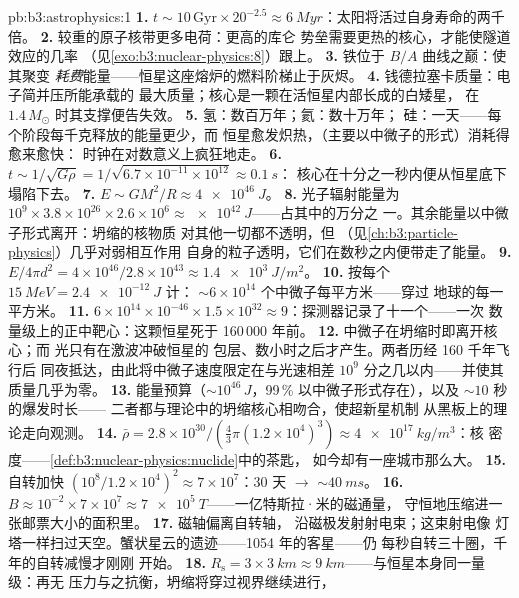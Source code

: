 \begin{solution}{pb:b3:astrophysics:1}
\textbf{1.} $t \sim 10\,\text{Gyr}\times20^{-2.5} \approx
\qty{6}{Myr}$：太阳将活过自身寿命的两千倍。
\textbf{2.} 较重的原子核带更多电荷：更高的库仑
势垒需要更热的核心，才能使隧道效应的几率
（见\cref{exo:b3:nuclear-physics:8}）跟上。
\textbf{3.} 铁位于 $B/A$ 曲线之巅：使其聚变
\emph{耗费}能量——恒星这座熔炉的燃料阶梯止于灰烬。
\textbf{4.} 钱德拉塞卡质量：电子简并压所能承载的
最大质量；核心是一颗在活恒星内部长成的白矮星，
在 $1.4\,M_\odot$ 时其支撑便告失效。
\textbf{5.} 氢：数百万年；氦：数十万年；
硅：一天——每个阶段每千克释放的能量更少，而
恒星愈发炽热，（主要以中微子的形式）消耗得愈来愈快：
时钟在对数意义上疯狂地走。
\textbf{6.} $t \sim 1/\sqrt{G\rho} =
1/\sqrt{6.7\times10^{-11}\times10^{12}} \approx \qty{0.1}{s}$：
核心在十分之一秒内便从恒星底下塌陷下去。
\textbf{7.} $E \sim GM^2/R \approx \qty{4e46}{J}$。
\textbf{8.} 光子辐射能量为 $10^9\times3.8\times10^{26}
\times2.6\times10^{6} \approx \qty{e42}{J}$——占其中的万分之
一。其余能量以中微子形式离开：坍缩的核物质
对其他一切都不透明，但
（见\cref{ch:b3:particle-physics}）几乎对弱相互作用
自身的粒子透明，它们在数秒之内便带走了能量。
\textbf{9.} $E/4\pi d^2 = 4\times10^{46}/2.8\times10^{43}
\approx \qty{1.4e3}{J/m^2}$。
\textbf{10.} 按每个 $\qty{15}{MeV} = \qty{2.4e-12}{J}$ 计：
${\sim}6\times10^{14}$ 个中微子每平方米——穿过
地球的每一平方米。
\textbf{11.} $6\times10^{14}\times10^{-46}\times1.5\times
10^{32} \approx 9$：探测器记录了十一个——一次
数量级上的正中靶心：这颗恒星死于
160\,000 年前。
\textbf{12.} 中微子在坍缩时即离开核心；而
光只有在激波冲破恒星的
包层、数小时之后才产生。两者历经 160 千年飞行后
同夜抵达，由此将中微子速度限定在与光速相差
$10^{9}$ 分之几以内——并使其质量几乎为零。
\textbf{13.} 能量预算（$\sim10^{46}\,\unit{J}$，99\,\%
以中微子形式存在），以及 ${\sim}10$ 秒的爆发时长——
二者都与理论中的坍缩核心相吻合，使超新星机制
从黑板上的理论走向观测。
\textbf{14.} $\bar\rho = 2.8\times10^{30}/(\tfrac43\pi
(1.2\times10^4)^3) \approx \qty{4e17}{kg/m^3}$：核
密度——\cref{def:b3:nuclear-physics:nuclide}中的茶匙，
如今却有一座城市那么大。
\textbf{15.} 自转加快 $(10^8/1.2\times10^4)^2 \approx
7\times10^{7}$：30 天 $\to$ ${\sim}\qty{40}{ms}$。
\textbf{16.} $B \approx 10^{-2}\times7\times10^{7} \approx
\qty{7e5}{T}$——一亿特斯拉·米的磁通量，
守恒地压缩进一张邮票大小的面积里。
\textbf{17.} 磁轴偏离自转轴，
沿磁极发射射电束；这束射电像
灯塔一样扫过天空。蟹状星云的遗迹——1054 年的客星——仍
每秒自转三十圈，千年的自转减慢才刚刚
开始。
\textbf{18.} $R_{\text{s}} = 3\times\qty{3}{km} \approx
\qty{9}{km}$——与恒星本身同一量级：再无
压力与之抗衡，坍缩将穿过视界继续进行，

\end{solution}
